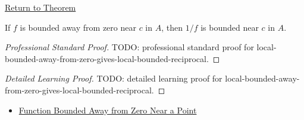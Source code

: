 \newpage
{}
\label{prf:local-bounded-away-from-zero-gives-local-bounded-reciprocal}

\begin{remark*}[Return]
\hyperref[thm:local-bounded-away-from-zero-gives-local-bounded-reciprocal]{Return to Theorem}
\end{remark*}

\begin{theorem*}
If \(f\) is bounded away from zero near \(c\) in \(A\), then \(1/f\) is
bounded near \(c\) in \(A\).
\end{theorem*}

\begin{proof}[Professional Standard Proof]
\LRAProofBodyStart
TODO: professional standard proof for local-bounded-away-from-zero-gives-local-bounded-reciprocal.
\end{proof}

\begin{proof}[Detailed Learning Proof]
\LRAProofBodyStart
TODO: detailed learning proof for local-bounded-away-from-zero-gives-local-bounded-reciprocal.
\end{proof}

\begin{remark*}
\end{remark*}

\begin{dependencies}
\begin{itemize}
  \item \hyperref[def:function-bounded-away-from-zero-near]{Function Bounded Away from Zero Near a Point}
\end{itemize}
\end{dependencies}

\clearpage
